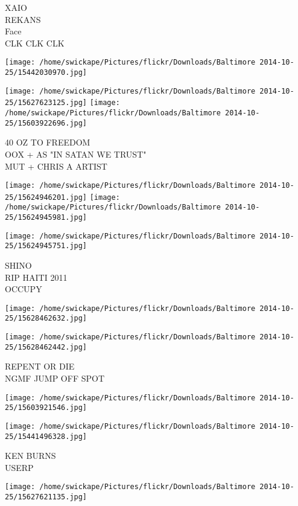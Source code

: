 \documentclass[10pt,letterpaper]{article}
\begin{document}
XAIO\\
REKANS\\
Face\\
CLK CLK CLK
\pagebreak

\texttt{[image: /home/swickape/Pictures/flickr/Downloads/Baltimore 2014-10-25/15442030970.jpg]}

\vspace{0.25in}
\texttt{[image: /home/swickape/Pictures/flickr/Downloads/Baltimore 2014-10-25/15627623125.jpg]}
\texttt{[image: /home/swickape/Pictures/flickr/Downloads/Baltimore 2014-10-25/15603922696.jpg]}

40 OZ TO FREEDOM\\
OOX + AS "IN SATAN WE TRUST"\\
MUT + CHRIS A ARTIST
\pagebreak

\texttt{[image: /home/swickape/Pictures/flickr/Downloads/Baltimore 2014-10-25/15624946201.jpg]}
\texttt{[image: /home/swickape/Pictures/flickr/Downloads/Baltimore 2014-10-25/15624945981.jpg]}

\vspace{0.25in}
\texttt{[image: /home/swickape/Pictures/flickr/Downloads/Baltimore 2014-10-25/15624945751.jpg]}

SHINO\\
RIP HAITI 2011\\
OCCUPY
\pagebreak

\texttt{[image: /home/swickape/Pictures/flickr/Downloads/Baltimore 2014-10-25/15628462632.jpg]}

\vspace{0.25in}
\texttt{[image: /home/swickape/Pictures/flickr/Downloads/Baltimore 2014-10-25/15628462442.jpg]}

REPENT OR DIE\\
NGMF JUMP OFF SPOT
\pagebreak

\texttt{[image: /home/swickape/Pictures/flickr/Downloads/Baltimore 2014-10-25/15603921546.jpg]}

\vspace{0.25in}
\texttt{[image: /home/swickape/Pictures/flickr/Downloads/Baltimore 2014-10-25/15441496328.jpg]}

KEN BURNS\\
USERP
\pagebreak

\texttt{[image: /home/swickape/Pictures/flickr/Downloads/Baltimore 2014-10-25/15627621135.jpg]}
\end{document}
